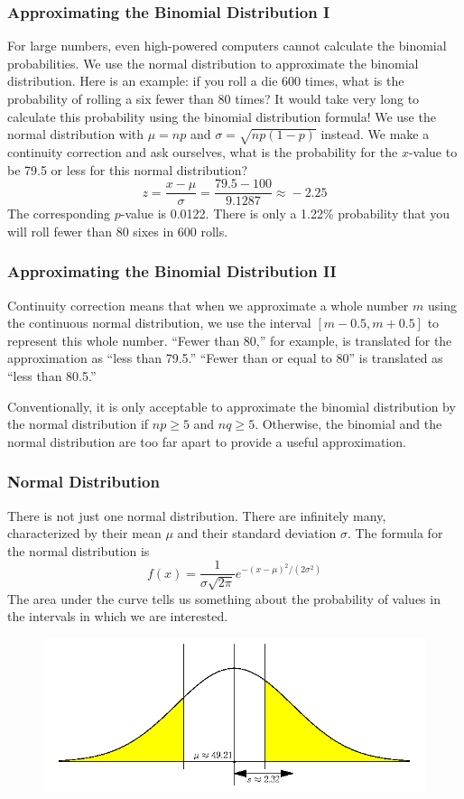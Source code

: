 \documentclass[xcolor=dvipsnames]{beamer}
\begin{document}
\begin{frame}
  \frametitle{Approximating the Binomial Distribution I}
For large numbers, even high-powered computers cannot calculate the
binomial probabilities. We use the normal distribution to approximate
the binomial distribution. Here is an example: if you roll a die 600
times, what is the probability of rolling a six fewer than 80 times? It
would take very long to calculate this probability using the binomial
distribution formula! We use the normal distribution with $\mu=np$ and
$\sigma=\sqrt{np(1-p)}$ instead. We make a \alert{continuity
  correction} and ask ourselves, what is the probability for the
$x$-value to be 79.5 or less for this normal distribution?
\begin{equation}
  \label{eq:oolojuth}
  z=\frac{x-\mu}{\sigma}=\frac{79.5-100}{9.1287}\approx{}-2.25
\end{equation}
The corresponding $p$-value is 0.0122. There is only a 1.22\%
probability that you will roll fewer than 80 sixes in 600 rolls.
\end{frame}

\begin{frame}
  \frametitle{Approximating the Binomial Distribution II}
Continuity correction means that when we approximate a whole number $m$
using the continuous normal distribution, we use the interval
$[m-0.5,m+0.5]$ to represent this whole number. ``Fewer than 80,'' for
example, is translated for the approximation as ``less than 79.5.''
``Fewer than or equal to 80'' is translated as ``less than 80.5.''

Conventionally, it is only acceptable to approximate the binomial
distribution by the normal distribution if $np\geq{}5$ and
$nq\geq{}5$. Otherwise, the binomial and the normal distribution are
too far apart to provide a useful approximation.
\end{frame}

\begin{frame}
  \frametitle{Normal Distribution}
There is not just one normal distribution. There are infinitely many,
characterized by their \alert{mean $\mu$} and their \alert{standard deviation
$\sigma$}. The formula for the normal distribution is
\begin{equation}
  \label{eq:aitoolah}
  f(x)=\frac{1}{\sigma\sqrt{2\pi}}e^{-(x-\mu)^{2}/(2\sigma^{2})}
\end{equation}
The area under the curve tells us something about the probability of
values in the intervals in which we are interested.
  \begin{figure}[h]
    \includegraphics[scale=.4]{./qfour.png}
  \end{figure}
\end{frame}
\end{document}
